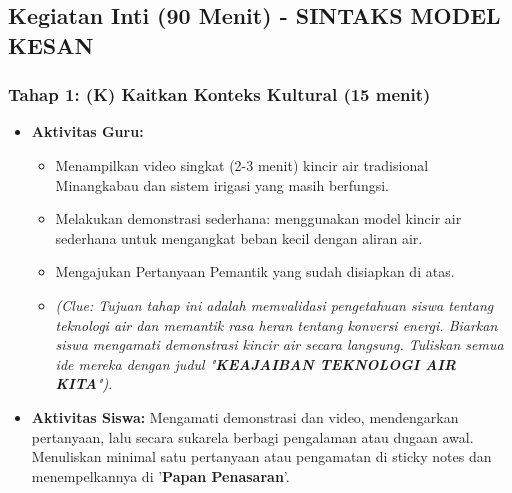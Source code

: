 \documentclass[12pt,a4paper]{article}
\begin{document}
\subsection{Kegiatan Inti (90 Menit) - SINTAKS MODEL KESAN}

\subsubsection{Tahap 1: (K) Kaitkan Konteks Kultural (15 menit)}
\begin{itemize}
\item \textbf{Aktivitas Guru:}
    \begin{itemize}
    \item Menampilkan video singkat (2-3 menit) kincir air tradisional Minangkabau dan sistem irigasi yang masih berfungsi.
    \item Melakukan demonstrasi sederhana: menggunakan model kincir air sederhana untuk mengangkat beban kecil dengan aliran air.
    \item Mengajukan Pertanyaan Pemantik yang sudah disiapkan di atas.
    \item \textit{(Clue: Tujuan tahap ini adalah memvalidasi pengetahuan siswa tentang teknologi air dan memantik rasa heran tentang konversi energi. Biarkan siswa mengamati demonstrasi kincir air secara langsung. Tuliskan semua ide mereka dengan judul "\textbf{KEAJAIBAN TEKNOLOGI AIR KITA}").}
    \end{itemize}
\item \textbf{Aktivitas Siswa:} Mengamati demonstrasi dan video, mendengarkan pertanyaan, lalu secara sukarela berbagi pengalaman atau dugaan awal. Menuliskan minimal satu pertanyaan atau pengamatan di sticky notes dan menempelkannya di '\textbf{Papan Penasaran}'.
\end{itemize}
\end{document}
